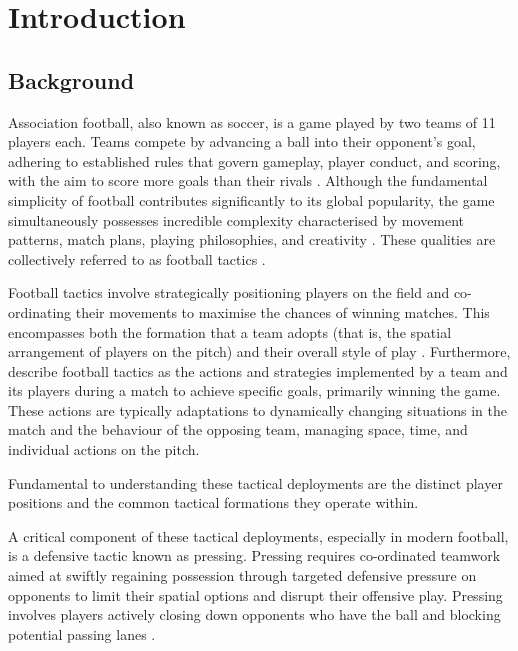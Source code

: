 
\chapter{Introduction}

\section{Background}

Association football, also known as soccer, is a game played by two teams of 11 players each. Teams compete by advancing a ball into their opponent's goal, adhering to established rules that govern gameplay, player conduct, and scoring, with the aim to score more goals than their rivals \citep{memmert_data_2018, sumpter_soccermatics_2016}. Although the fundamental simplicity of football contributes significantly to its global popularity, the game simultaneously possesses incredible complexity characterised by movement patterns, match plans, playing philosophies, and creativity \citep{bornn_soccer_2018, vicente_why_2024}. These qualities are collectively referred to as football tactics \citep{memmert_data_2018}.

Football tactics involve strategically positioning players on the field and co-ordinating their movements to maximise the chances of winning matches. This encompasses both the formation that a team adopts (that is, the spatial arrangement of players on the pitch) and their overall style of play \citep{wilson_inverting_2010}. Furthermore, \citet{rein_big_2016} describe football tactics as the actions and strategies implemented by a team and its players during a match to achieve specific goals, primarily winning the game. These actions are typically adaptations to dynamically changing situations in the match and the behaviour of the opposing team, managing space, time, and individual actions on the pitch.

Fundamental to understanding these tactical deployments are the distinct player positions and the common tactical formations they operate within. 

A critical component of these tactical deployments, especially in modern football, is a defensive tactic known as pressing. Pressing requires co-ordinated teamwork aimed at swiftly regaining possession through targeted defensive pressure on opponents to limit their spatial options and disrupt their offensive play. Pressing involves players actively closing down opponents who have the ball and blocking potential passing lanes \citep{borbely_all_2018}.

